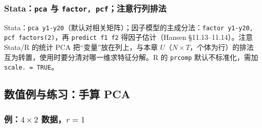 \subsubsection{Stata：{\mdseries\texttt{pca}} 与 {\mdseries\texttt{factor, pcf}}；注意行列排法}

Stata：\texttt{pca y1-y20}（默认对相关矩阵）；因子模型的主成分法：\texttt{factor y1-y20, pcf factors(2)}，再 \texttt{predict f1 f2} 得因子估计（Hansen §11.13--11.14）。注意 Stata/R 的统计 PCA 把“变量”放在列上，与本章 $U$（$N\times T$，个体为行）的排法互为转置，使用时要分清对哪一维求特征分解。R 的 \texttt{prcomp} 默认不标准化，需加 \texttt{scale.\ = TRUE}。

\subsection{数值例与练习：手算 PCA}

\subsubsection{例：\texorpdfstring{$4\times2$}{4 x 2} 数据，\texorpdfstring{$r=1$}{r = 1}}

